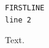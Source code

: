 \documentclass[a4paper,oneside]{memoir}
\begin{document}
\begin{Verbatim}
FIRSTLINE
line 2
\end{Verbatim}
Text.
\end{document}
